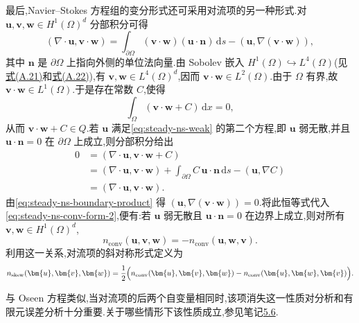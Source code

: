 \begin{note}
最后,Navier--Stokes 方程组的变分形式还可采用对流项的另一种形式.对 $\bm{u},\bm{v},\bm{w}\in H^1(\Omega)^d$ 分部积分可得
\begin{equation}\label{eq:steady-ns-boundary-product}
  (\nabla\cdot\bm{u},\bm{v}\cdot\bm{w})
    =\int_{\partial\Omega}(\bm{v}\cdot\bm{w})
       (\bm{u}\cdot\bm{n})\,\mathrm{d}s
      -(\bm{u},\nabla(\bm{v}\cdot\bm{w})),
\end{equation}
其中 $\bm{n}$ 是 $\partial\Omega$ 上指向外侧的单位法向量.由 Sobolev 嵌入 $H^1(\Omega)\hookrightarrow L^4(\Omega)$(见\hyperref[eq:appendix-a-21]{式(A.21)}和\hyperref[eq:appendix-a-22]{式(A.22)}),有 $\bm{v},\bm{w}\in L^4(\Omega)^d$,因而 $\bm{v}\cdot\bm{w}\in L^2(\Omega)$.由于 $\Omega$ 有界,故 $\bm{v}\cdot\bm{w}\in L^1(\Omega)$.于是存在常数 $C$,使得
\[
  \int_\Omega(\bm{v}\cdot\bm{w}+C)\,\mathrm{d}x=0,
\]
从而 $\bm{v}\cdot\bm{w}+C\in Q$.若 $\bm{u}$ 满足\cref{eq:steady-ns-weak} 的第二个方程,即 $\bm{u}$ 弱无散,并且 $\bm{u}\cdot\bm{n}=0$ 在 $\partial\Omega$ 上成立,则分部积分给出
\begin{equation}\label{eq:steady-ns-div-vw-zero}
\begin{aligned}
  0&=(\nabla\cdot\bm{u},\bm{v}\cdot\bm{w}+C)\\
   &=(\nabla\cdot\bm{u},\bm{v}\cdot\bm{w})
     +\int_{\partial\Omega}C\,\bm{u}\cdot\bm{n}\,\mathrm{d}s
     -(\bm{u},\nabla C)\\
   &=(\nabla\cdot\bm{u},\bm{v}\cdot\bm{w}).
\end{aligned}
\end{equation}
由\cref{eq:steady-ns-boundary-product} 得 $(\bm{u},\nabla(\bm{v}\cdot\bm{w}))=0$.将此恒等式代入\cref{eq:steady-ns-conv-form-2},便有:若 $\bm{u}$ 弱无散且 $\bm{u}\cdot\bm{n}=0$ 在边界上成立,则对所有 $\bm{v},\bm{w}\in H^1(\Omega)^d$,
\begin{equation}\label{eq:steady-ns-conv-skew}
  n_{\mathrm{conv}}(\bm{u},\bm{v},\bm{w})
    =-n_{\mathrm{conv}}(\bm{u},\bm{w},\bm{v}).
\end{equation}
利用这一关系,对流项的斜对称形式定义为
\begin{equation}\label{eq:steady-ns-nskew-definition}
  n_{\mathrm{skew}}(\bm{u},\bm{v},\bm{w})
    =\frac12\Bigl(n_{\mathrm{conv}}(\bm{u},\bm{v},\bm{w})
                   -n_{\mathrm{conv}}(\bm{u},\bm{w},\bm{v})\Bigr).
\end{equation}
\end{note}

\begin{note}[对流项的消失]\label{note:steady-ns-convection-vanishing-motivation}
与 Oseen 方程类似,当对流项的后两个自变量相同时,该项消失这一性质对分析和有限元误差分析十分重要.关于哪些情形下该性质成立,参见笔记\hyperref[note:oseen-skew-symmetry]{5.6}.
\end{note}

